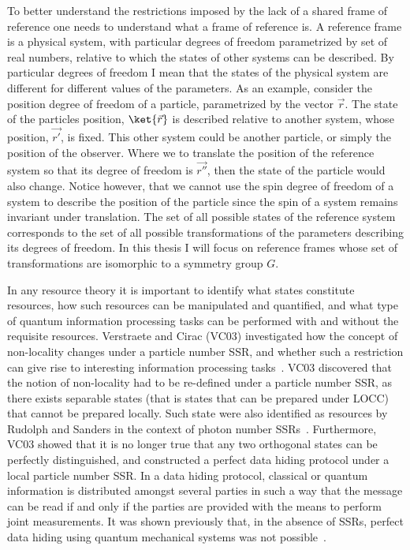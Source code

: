To better understand the restrictions imposed by the lack of a shared frame of reference one needs to understand what a frame of reference is.  A reference frame is a physical system, with particular degrees of freedom parametrized by set of real numbers, relative to which the states of other systems can be described.  By particular degrees of freedom I mean that the states of the physical system are different for different values of the parameters.  As an example, consider the position degree of freedom of a particle, parametrized by the vector $\vec{r}$.  The state of the particles position, $\ket{\vec{r}}$ is described relative to another system, whose position, $\vec{r'}$, is fixed.  This other system could be another particle, or simply the position of the observer.  Where we to translate the position of the reference system so that its degree of freedom is $\vec{r''}$,  then the state of the particle would also change.  Notice however, that we cannot use the spin degree of freedom of a system to describe the position of the particle since the spin of a system remains invariant under translation.  The set of all possible states of the reference system corresponds to the set of all possible transformations of the parameters describing its degrees of freedom.   In this thesis I will focus on reference frames whose set of transformations are isomorphic to a symmetry group $G$. 

In any resource theory it is important to identify what states constitute resources, how such resources can be manipulated and quantified, and what type of quantum information processing tasks can be performed with and without the requisite resources. Verstraete and Cirac (VC03) investigated how the concept of non-locality changes under a particle number SSR, and whether such a restriction can give rise to interesting information processing tasks~\cite{VC03}.  VC03 discovered that the notion of non-locality had to be re-defined under a particle number SSR, as there exists separable states (that is states that can be prepared under LOCC) that cannot be prepared locally. Such state were also identified as resources by Rudolph and Sanders in the context of photon number SSRs~\cite{RB01}. Furthermore, VC03 showed that it is no longer true that any two orthogonal states can be perfectly distinguished, and constructed a perfect data hiding protocol under a local particle number SSR.  In a data hiding protocol, classical or quantum information is distributed amongst several parties in such a way that the message can be read if and only if the parties are provided with the means to perform joint measurements. It was shown previously that, in the absence of SSRs, perfect data hiding using quantum mechanical systems was not possible~\cite{TDL01,DLT02}.

